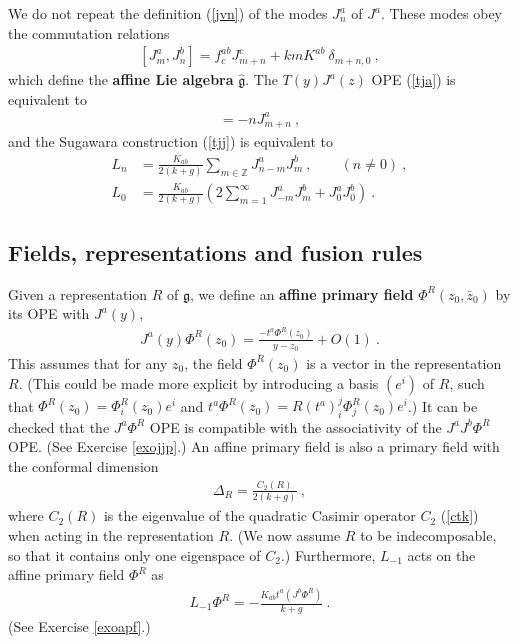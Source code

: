 \documentclass[12pt,a4paper,notitlepage]{report}
\newcommand \Z {\mathbb{Z}}
\numberwithin{equation}{section}
\theoremstyle{break}
\begin{document}
We do not repeat the definition (\ref{jvn}) of the modes $J^a_n$ of $J^a$. These modes obey the commutation relations
\begin{align}
 \boxed{[J^a_m,J^b_n] =   f^{ab}_c J^c_{m+n} +kmK^{ab}\ \delta_{m+n,0}} \ , 
\label{jam}
\end{align}
which define the \textbf{\boldmath affine Lie algebra} $\hat{\mathfrak{g}}$. 
The $T(y)J^a(z)$ OPE (\ref{tja}) is equivalent to
\begin{align}
 [L_m,J^a_n] = -nJ^a_{m+n}\ ,
\end{align}
and the Sugawara construction (\ref{tjj}) is equivalent to 
\begin{align}
 L_n &= \frac{K_{ab}}{2(k+g)} \sum_{m\in\Z} J^a_{n-m}J^b_m\ , \qquad (n\neq 0)\ ,
\label{ljj}
\\
L_0 & = \frac{K_{ab}}{2(k+g)}\left(2\sum_{m=1}^\infty J^a_{-m}J^b_m + J^a_0J^b_0\right)\ .
\label{lzjj}
\end{align}

\subsection{Fields, representations and fusion rules}
 
Given a representation $R$ of $\mathfrak{g}$, we define an \textbf{\boldmath affine primary field} $\Phi^{R}(z_0,\bar{z}_0)$ by its OPE with $J^a(y)$,
\begin{align}
 \boxed{ J^a(y) \Phi^{R}(z_0) = \frac{-t^a\Phi^{R}(z_0)}{y-z_0} + O(1) } \ .
\label{jpr}
\end{align}
This assumes that for any $z_0$, the field $\Phi^{R}(z_0)$ is a vector in the representation $R$. (This could be made more explicit by introducing  a basis $(e^i)$ of $R$, such that $\Phi^{R}(z_0) = \Phi^{R}_i(z_0)e^i$ and $t^a \Phi^{R}(z_0) = R(t^a)_i^j \Phi^{R}_j(z_0)e^i$.) 
It can be checked that the $J^a\Phi^R$ OPE is compatible with the associativity of the $J^aJ^b\Phi^R$ OPE. (See Exercise \ref{exojjp}.)
An affine primary field is also a primary field with the conformal dimension 
\begin{align}
 \boxed{\Delta_R  = \frac{C_2(R)}{2(k+g)}}\ ,
\label{dr}
\end{align}
where $C_2(R)$ is the eigenvalue of the quadratic Casimir operator $C_2$ (\ref{ctk}) when acting in the representation $R$. (We now assume $R$ to be indecomposable, so that it contains only one eigenspace of $C_2$.) Furthermore, $L_{-1}$ acts on the affine primary field $\Phi^R$ as 
\begin{align}
L_{-1}\Phi^R = -\frac{K_{ab}t^a(J^b\Phi^R)}{k+g} \ .
\label{lmp}
\end{align}
(See Exercise \ref{exoapf}.)
\end{document}
